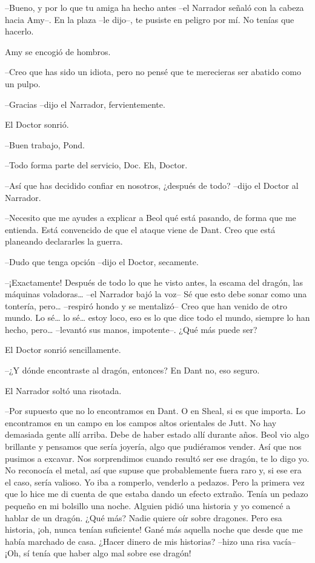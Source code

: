 {--Bueno, y por lo que tu amiga ha hecho antes --el Narrador señaló
	con la cabeza hacia Amy--. En la plaza --le dijo--, te pusiste en
peligro por mí. No tenías que hacerlo.}

{Amy se encogió de hombros.}

{--Creo que has sido un idiota, pero no pensé que te merecieras ser
abatido como un pulpo.}

{--Gracias --dijo el Narrador, fervientemente.}

{El Doctor sonrió.}

{--Buen trabajo, Pond.}

{--Todo forma parte del servicio, Doc. Eh, Doctor.}

{--Así que has decidido confiar en nosotros, ¿después de todo? --dijo
el Doctor al Narrador.}

{--Necesito que me ayudes a explicar a Beol qué está pasando, de forma
	que me entienda. Está convencido de que el ataque viene de Dant. Creo
que está planeando declararles la guerra.}

{--Dudo que tenga opción --dijo el Doctor, secamente.}

{--¡Exactamente! Después de todo lo que he visto antes, la escama del
	dragón, las máquinas voladoras\ldots{} --el Narrador bajó la voz-- Sé
	que esto debe sonar como una tontería, pero\ldots{} --respiró hondo y se
	mentalizó-- Creo que han venido de otro mundo. Lo sé\ldots{} lo
	sé\ldots{} estoy loco, eso es lo que dice todo el mundo, siempre lo han
	hecho, pero\ldots{} --levantó sus manos, impotente--. ¿Qué más puede
ser?}

{El Doctor sonrió sencillamente.}

{--¿Y dónde encontraste al dragón, entonces? En Dant no, eso seguro.}

{El Narrador soltó una risotada.}

{--Por supuesto que no lo encontramos en Dant. O en Sheal, si es que
	importa. Lo encontramos en un campo en los campos altos orientales de
	Jutt. No hay demasiada gente allí arriba. Debe de haber estado allí
	durante años. Beol vio algo brillante y pensamos que sería joyería, algo
	que pudiéramos vender. Así que nos pusimos a excavar. Nos sorprendimos
	cuando resultó ser ese dragón, te lo digo yo. No reconocía el metal, así
	que supuse que probablemente fuera raro y, si ese era el caso, sería
	valioso. Yo iba a romperlo, venderlo a pedazos. Pero la primera vez que
	lo hice me di cuenta de que estaba dando un efecto extraño. Tenía un
	pedazo pequeño en mi bolsillo una noche. Alguien pidió una historia y yo
	comencé a hablar de un dragón. ¿Qué más? Nadie quiere oír sobre
	dragones. Pero esa historia, ¡oh, nunca tenían suficiente! Gané más
	aquella noche que desde que me había marchado de casa. ¿Hacer dinero de
	mis historias? --hizo una risa vacía-- ¡Oh, sí tenía que haber algo mal
sobre ese dragón!}

